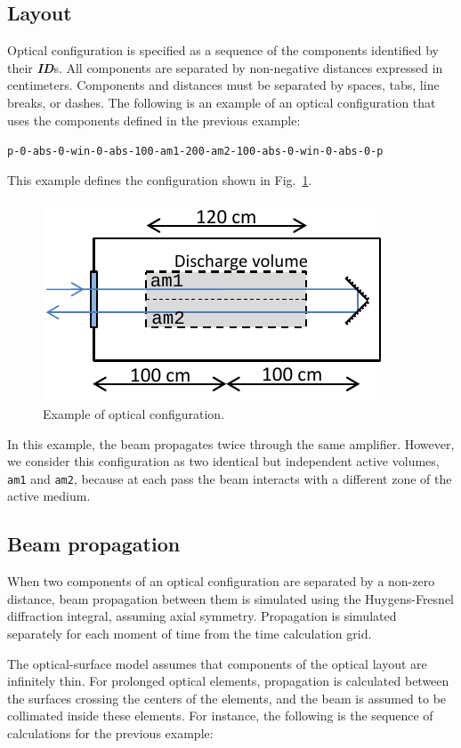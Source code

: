 \documentclass{report}
\begin{document}
\subsection{Layout}
Optical configuration is specified as a sequence of the components identified by their \textit{\textbf{ID}}s. All components are separated by non-negative distances expressed in centimeters. Components and distances must be separated by spaces, tabs, line breaks, or dashes. The following is an example of an optical configuration that uses the components defined in the previous example:

\bigskip
\texttt{p-0-abs-0-win-0-abs-100-am1-200-am2-100-abs-0-win-0-abs-0-p }
\bigskip

This example defines the configuration shown in Fig.~\ref{fig:optical-configuration-1}.

\begin{figure}[ht]
\centering
\includegraphics{images/optical-configuration-1}
\caption{Example of optical configuration.}\label{fig:optical-configuration-1}
\end{figure}

In this example, the beam propagates twice through the same amplifier. However, we consider this configuration as two identical but independent active volumes, \texttt{am1} and \texttt{am2}, because at each pass the beam interacts with a different zone of the active medium.

\subsection{Beam propagation}
When two components of an optical configuration are separated by a non-zero distance, beam propagation between them is simulated using the Huygens-Fresnel diffraction integral, assuming axial symmetry. Propagation is simulated separately for each moment of time from the time calculation grid.

The optical-surface model assumes that components of the optical layout are infinitely thin. For prolonged optical elements, propagation is calculated between the surfaces crossing the centers of the elements, and the beam is assumed to be collimated inside these elements. For instance, the following is the sequence of calculations for the previous example:
\end{document}
